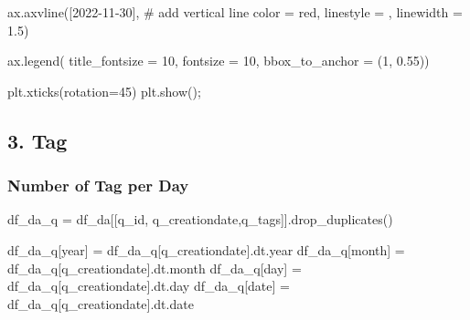\documentclass[
  letterpaper,
  DIV=11,
  numbers=noendperiod]{scrartcl}
\newenvironment{Shaded}{\begin{snugshade}}{\end{snugshade}}
\newcommand{\CommentTok}[1]{\textcolor[rgb]{0.37,0.37,0.37}{#1}}
\newcommand{\DecValTok}[1]{\textcolor[rgb]{0.68,0.00,0.00}{#1}}
\newcommand{\FloatTok}[1]{\textcolor[rgb]{0.68,0.00,0.00}{#1}}
\newcommand{\NormalTok}[1]{\textcolor[rgb]{0.00,0.23,0.31}{#1}}
\newcommand{\OperatorTok}[1]{\textcolor[rgb]{0.37,0.37,0.37}{#1}}
\newcommand{\StringTok}[1]{\textcolor[rgb]{0.13,0.47,0.30}{#1}}
\begin{document}
\begin{Shaded}
\begin{Highlighting}[]
\NormalTok{ax.axvline([}\StringTok{\textquotesingle{}2022{-}11{-}30\textquotesingle{}}\NormalTok{], }\CommentTok{\# add vertical line}
\NormalTok{           color }\OperatorTok{=} \StringTok{\textquotesingle{}red\textquotesingle{}}\NormalTok{,}
\NormalTok{           linestyle }\OperatorTok{=} \StringTok{\textquotesingle{}{-}{-}\textquotesingle{}}\NormalTok{,}
\NormalTok{           linewidth }\OperatorTok{=} \FloatTok{1.5}\NormalTok{)}

\NormalTok{ax.legend( title\_fontsize }\OperatorTok{=} \DecValTok{10}\NormalTok{, fontsize }\OperatorTok{=} \DecValTok{10}\NormalTok{,}
\NormalTok{          bbox\_to\_anchor }\OperatorTok{=}\NormalTok{ (}\DecValTok{1}\NormalTok{, }\FloatTok{0.55}\NormalTok{))}

\NormalTok{plt.xticks(rotation}\OperatorTok{=}\DecValTok{45}\NormalTok{)}
\NormalTok{plt.show()}\OperatorTok{;}
\end{Highlighting}
\end{Shaded}

\subsection{3. Tag}\label{tag}

\subsubsection{Number of Tag per Day}\label{number-of-tag-per-day}

\begin{Shaded}
\begin{Highlighting}[]
\NormalTok{df\_da\_q }\OperatorTok{=}\NormalTok{ df\_da[[}\StringTok{\textquotesingle{}q\_id\textquotesingle{}}\NormalTok{, }\StringTok{\textquotesingle{}q\_creationdate\textquotesingle{}}\NormalTok{,}\StringTok{\textquotesingle{}q\_tags\textquotesingle{}}\NormalTok{]].drop\_duplicates()}
\end{Highlighting}
\end{Shaded}

\begin{Shaded}
\begin{Highlighting}[]
\NormalTok{df\_da\_q[}\StringTok{\textquotesingle{}year\textquotesingle{}}\NormalTok{] }\OperatorTok{=}\NormalTok{ df\_da\_q[}\StringTok{\textquotesingle{}q\_creationdate\textquotesingle{}}\NormalTok{].dt.year}
\NormalTok{df\_da\_q[}\StringTok{\textquotesingle{}month\textquotesingle{}}\NormalTok{] }\OperatorTok{=}\NormalTok{ df\_da\_q[}\StringTok{\textquotesingle{}q\_creationdate\textquotesingle{}}\NormalTok{].dt.month}
\NormalTok{df\_da\_q[}\StringTok{\textquotesingle{}day\textquotesingle{}}\NormalTok{] }\OperatorTok{=}\NormalTok{ df\_da\_q[}\StringTok{\textquotesingle{}q\_creationdate\textquotesingle{}}\NormalTok{].dt.day}
\NormalTok{df\_da\_q[}\StringTok{\textquotesingle{}date\textquotesingle{}}\NormalTok{] }\OperatorTok{=}\NormalTok{ df\_da\_q[}\StringTok{\textquotesingle{}q\_creationdate\textquotesingle{}}\NormalTok{].dt.date}
\end{Highlighting}
\end{Shaded}
\end{document}
